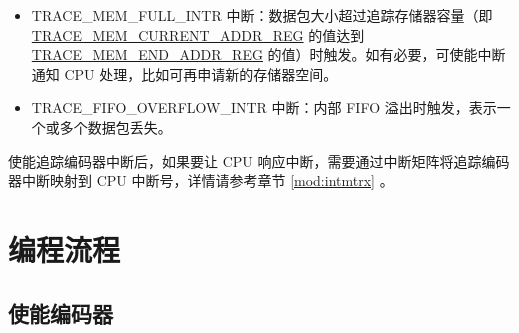 \documentclass[main\_\_CN.tex]{subfiles}
\begin{document}
\begin{itemize}
    \item TRACE\_MEM\_FULL\_INTR 中断：数据包大小超过追踪存储器容量（即 \hyperref[regdesc:TRACEMEMCURRENTADDRREG]{TRACE\_MEM\_CURRENT\_ADDR\_REG} 的值达到 \hyperref[regdesc:TRACEMEMENDADDRREG]{TRACE\_MEM\_END\_ADDR\_REG} 的值）时触发。如有必要，可使能中断通知 CPU 处理，比如可再申请新的存储器空间。
    \item TRACE\_FIFO\_OVERFLOW\_INTR 中断：内部 FIFO 溢出时触发，表示一个或多个数据包丢失。
\end{itemize}

使能追踪编码器中断后，如果要让 CPU 响应中断，需要通过中断矩阵将追踪编码器中断映射到 CPU 中断号，详情请参考章节 \ref{mod:intmtrx} \textit{}。


\section{编程流程}
\label{sec:riscvtracenc-prog-procedures}

\subsection{使能编码器}
\end{document}
